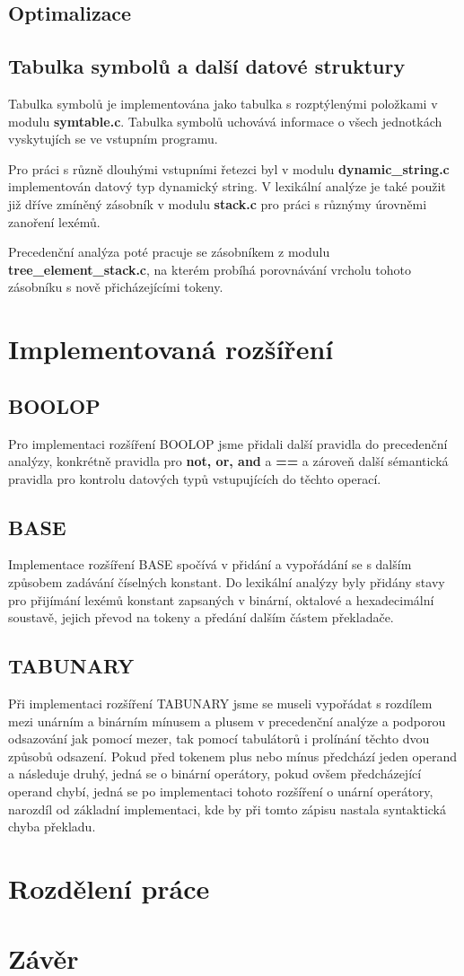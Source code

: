 \documentclass[12pt]{article}
\begin{document}
\subsection{Optimalizace}
\subsection{Tabulka symbolů a další datové struktury}
Tabulka symbolů je implementována jako tabulka s rozptýlenými položkami v modulu \textbf{symtable.c}. Tabulka symbolů uchovává informace o všech jednotkách vyskytujích se ve vstupním programu. 

Pro práci s různě dlouhými vstupními řetezci byl v modulu \textbf{dynamic\_string.c} implementován datový typ dynamický string. V lexikální analýze je také použit již dříve zmíněný zásobník v modulu \textbf{stack.c} pro práci s různýmy úrovněmi zanoření lexémů.


Precedenční analýza poté pracuje se zásobníkem z modulu \textbf{tree\_element\_stack.c}, na kterém pro\-bí\-há porovnávání vrcholu tohoto zásobníku s nově přicházejícími tokeny.
\section{Implementovaná rozšíření}
\subsection{BOOLOP}
Pro implementaci rozšíření BOOLOP jsme přidali další pravidla do precedenční analýzy, konkrétně pravidla pro \textbf{not, or, and} a \textbf{==} a zároveň další sémantická pravidla pro kontrolu datových typů vstupujících do těchto operací.
\subsection{BASE}
Implementace rozšíření BASE spočívá v přidání a vypořádání se s dalším způsobem zadávání čí\-sel\-ných konstant. Do lexikální analýzy byly přidány stavy pro přijímání lexémů konstant zapsaných v binární, oktalové a hexadecimální soustavě, jejich převod na tokeny a předání dalším částem pře\-kla\-da\-če.
\subsection{TABUNARY}
Při implementaci rozšíření TABUNARY jsme se museli vypořádat s rozdílem mezi unárním a bi\-nár\-ním mínusem a plusem v precedenční analýze a podporou odsazování jak pomocí mezer, tak pomocí tabulátorů i prolínání těchto dvou způsobů odsazení. Pokud před tokenem plus nebo mínus předchází jeden operand a následuje druhý, jedná se o binární operátory, pokud ovšem předcházející operand chybí, jedná se po implementaci tohoto rozšíření o unární operátory, narozdíl od základní implementaci, kde by při tomto zápisu nastala syntaktická chyba překladu.
\section{Rozdělení práce}
\section{Závěr}
\end{document}
